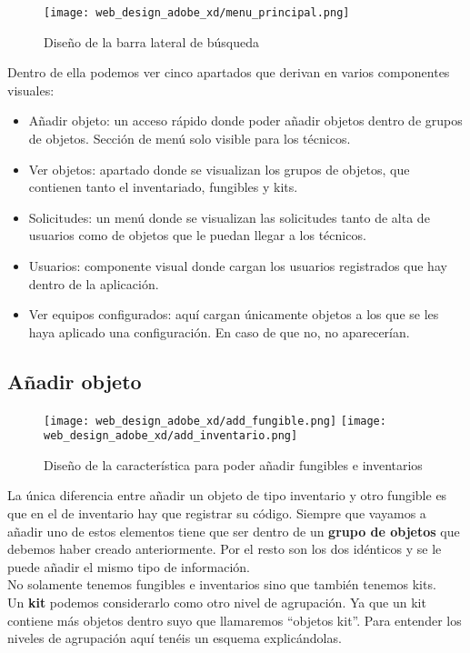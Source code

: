 \begin{figure}
    \begin{center}
        \texttt{[image: web\_design\_adobe\_xd/menu\_principal.png]}
        \caption{Diseño de la barra lateral de búsqueda}
    \end{center}
\end{figure}

Dentro de ella podemos ver cinco apartados que derivan en varios componentes visuales:

\begin{itemize}
    \item Añadir objeto: un acceso rápido donde poder añadir objetos dentro de grupos de objetos. Sección de menú solo visible para los técnicos.
    \item Ver objetos: apartado donde se visualizan los grupos de objetos, que contienen tanto el inventariado, fungibles y kits.
    \item Solicitudes: un menú donde se visualizan las solicitudes tanto de alta de usuarios como de objetos que le puedan llegar a los técnicos.
    \item Usuarios: componente visual donde cargan los usuarios registrados que hay dentro de la aplicación.
    \item Ver equipos configurados: aquí cargan únicamente objetos a los que se les haya aplicado una configuración. En caso de que no, no aparecerían.
\end{itemize}

\subsection{Añadir objeto}

\begin{figure}
    \begin{center}
        \texttt{[image: web\_design\_adobe\_xd/add\_fungible.png]}
        \texttt{[image: web\_design\_adobe\_xd/add\_inventario.png]}
        \caption{Diseño de la característica para poder añadir fungibles e inventarios}
    \end{center}
\end{figure}

La única diferencia entre añadir un objeto de tipo inventario y otro fungible es que en el de inventario hay que registrar su código. Siempre que vayamos a añadir uno de estos elementos tiene que ser dentro de un \textbf{grupo de objetos} que debemos haber creado anteriormente. Por el resto son los dos idénticos y se le puede añadir el mismo tipo de información.
\\No solamente tenemos fungibles e inventarios sino que también tenemos kits.
\\Un \textbf{kit} podemos considerarlo como otro nivel de agrupación. Ya que un kit contiene más objetos dentro suyo que llamaremos ``objetos kit''. Para entender los niveles de agrupación aquí tenéis un esquema explicándolas.

